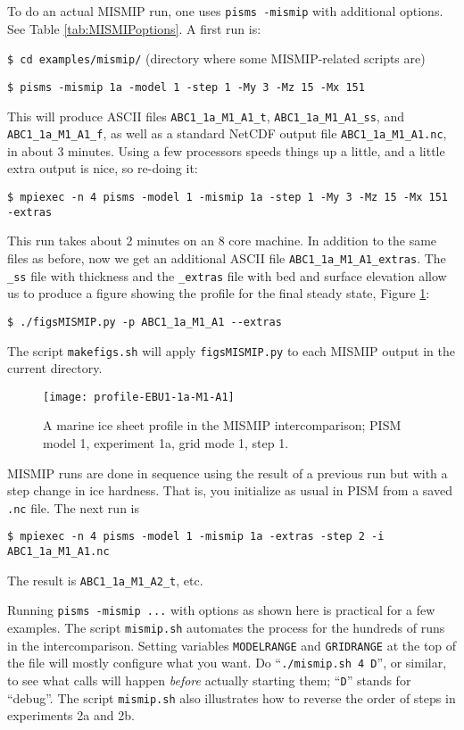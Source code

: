 To do an actual MISMIP run, one uses \verb|pisms -mismip| with additional options.  See Table \ref{tab:MISMIPoptions}.  A first run is:

\verb|$ cd examples/mismip/|  \hfill \scriptsize(directory where some MISMIP-related scripts are)\normalsize

\verb|$ pisms -mismip 1a -model 1 -step 1 -My 3 -Mz 15 -Mx 151|

\noindent This will produce ASCII files \verb|ABC1_1a_M1_A1_t|, \verb|ABC1_1a_M1_A1_ss|, and \verb|ABC1_1a_M1_A1_f|, as well as a standard NetCDF output file \verb|ABC1_1a_M1_A1.nc|, in about 3 minutes.  Using a few processors speeds things up a little, and a little extra output is nice, so re-doing it:

\verb|$ mpiexec -n 4 pisms -model 1 -mismip 1a -step 1 -My 3 -Mz 15 -Mx 151 -extras|

\noindent This run takes about 2 minutes on an 8 core machine.  In addition to the same files as before, now we get an additional ASCII file \verb|ABC1_1a_M1_A1_extras|.  The \verb|_ss| file with thickness and the \verb|_extras| file with bed and surface elevation allow us to produce a figure showing the profile for the final steady state, Figure \ref{fig:MISMIPmodel1exper1aM1A1}:

\verb|$ ./figsMISMIP.py -p ABC1_1a_M1_A1 --extras|

\noindent The script \verb|makefigs.sh| will apply \verb|figsMISMIP.py| to each MISMIP output in the current directory.

\begin{figure}[ht]
\texttt{[image: profile-EBU1-1a-M1-A1]}
\caption{A marine ice sheet profile in the MISMIP intercomparison; PISM model 1, experiment 1a, grid mode 1, step 1.}
\label{fig:MISMIPmodel1exper1aM1A1}
\end{figure}

MISMIP runs are done in sequence using the result of a previous run but with a step change in ice hardness.  That is, you initialize as usual in PISM from a saved \verb|.nc| file.  The next run is

\verb|$ mpiexec -n 4 pisms -model 1 -mismip 1a -extras -step 2 -i ABC1_1a_M1_A1.nc|

\noindent The result is \verb|ABC1_1a_M1_A2_t|, etc.

Running \verb|pisms -mismip ...| with options as shown here is practical for a few examples.  The script \verb|mismip.sh| automates the process for the hundreds of runs in the intercomparison.  Setting variables \verb|MODELRANGE| and \verb|GRIDRANGE| at the top of the file will mostly configure what you want.  Do ``\verb|./mismip.sh 4 D|'', or similar, to see what calls will happen \emph{before} actually starting them; ``\verb|D|'' stands for ``debug''.  The script \verb|mismip.sh| also illustrates how to reverse the order of steps in experiments 2a and 2b.

